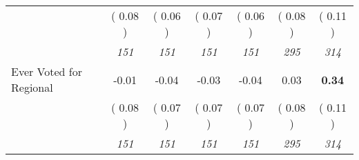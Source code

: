 \begin{tabular}{l c c c c c c}
& (     0.08 ) & (     0.06 ) & (     0.07 ) & (     0.06 ) & (     0.08 ) & (     0.11 ) \\
& \textit{ 151 } & \textit{ 151 } & \textit{ 151 } & \textit{ 151 } & \textit{ 295 } & \textit{ 314 } \\
Ever Voted for Regional &     -0.01 &     -0.04 &     -0.03 &     -0.04 &      0.03 & \textbf{      0.34 } \\
& (     0.08 ) & (     0.07 ) & (     0.07 ) & (     0.07 ) & (     0.08 ) & (     0.11 ) \\
& \textit{ 151 } & \textit{ 151 } & \textit{ 151 } & \textit{ 151 } & \textit{ 295 } & \textit{ 314 } \\
\bottomrule
\end{tabular}
